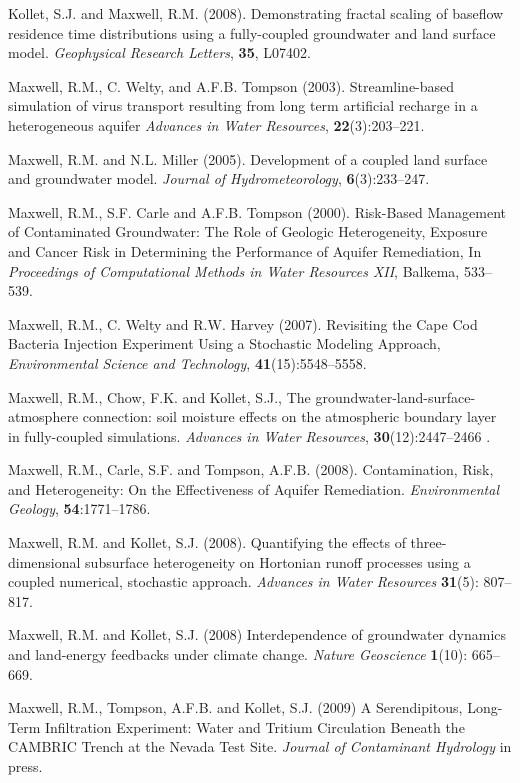 \begin{thebibliography}{99}
Kollet, S.J. and Maxwell, R.M. (2008). Demonstrating fractal scaling of baseflow residence time distributions using a fully-coupled groundwater and land surface model. {\em Geophysical Research Letters}, {\bf 35}, L07402. 

 Maxwell, R.M., C. Welty, and A.F.B. Tompson (2003).
Streamline-based simulation of virus transport resulting from long term
artificial recharge in a heterogeneous aquifer {\em Advances in Water
Resources}, {\bf 22}(3):203--221.

Maxwell, R.M. and N.L. Miller (2005). Development of a coupled land surface and groundwater model.  {\em Journal of Hydrometeorology}, {\bf 6}(3):233--247.

Maxwell, R.M., S.F. Carle and A.F.B. Tompson (2000). Risk-Based Management of Contaminated Groundwater: The Role of Geologic Heterogeneity, Exposure and Cancer Risk in Determining the Performance of Aquifer Remediation, In {\em Proceedings of Computational Methods in Water Resources XII}, Balkema, 533--539.

 Maxwell, R.M., C. Welty and R.W. Harvey (2007). Revisiting the Cape Cod Bacteria Injection Experiment Using a Stochastic Modeling Approach, {\em Environmental Science and Technology}, { \bf 41}(15):5548--5558.

Maxwell, R.M., Chow, F.K. and Kollet, S.J., The groundwater-land-surface-atmosphere connection: soil moisture effects on the atmospheric boundary layer in fully-coupled simulations. {\em Advances in Water Resources}, {\bf 30}(12):2447--2466 .

Maxwell, R.M., Carle, S.F. and Tompson, A.F.B. (2008).
Contamination, Risk, and Heterogeneity: On the Effectiveness of Aquifer Remediation. {\em Environmental Geology}, {\bf 54}:1771--1786.

Maxwell, R.M. and Kollet, S.J. (2008). Quantifying the effects of three-dimensional subsurface heterogeneity on Hortonian runoff processes using a coupled numerical, stochastic approach. {\em Advances in Water Resources} {\bf 31}(5): 807--817. 

Maxwell, R.M. and Kollet, S.J. (2008) Interdependence of groundwater dynamics and land-energy feedbacks under climate change. {\em Nature Geoscience} {\bf 1}(10): 665--669.

Maxwell, R.M., Tompson, A.F.B. and Kollet, S.J. (2009) A Serendipitous, Long-Term Infiltration Experiment: Water and Tritium Circulation Beneath the CAMBRIC Trench at the Nevada Test Site. {\em Journal of Contaminant Hydrology} in press.


\end{thebibliography}

